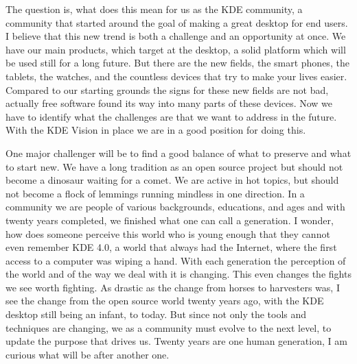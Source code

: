 The question is, what does this mean for us as the KDE community, a community that started around the goal of making a great desktop for end users. I believe that this new trend is both a challenge and an opportunity at once. We have our main products, which target at the desktop, a solid platform which will be used still for a long future. But there are the new fields, the smart phones, the tablets, the watches, and the countless devices that try to make your lives easier. Compared to our starting grounds the signs for these new fields are not bad, actually free software found its way into many parts of these devices. Now we have to identify what the challenges are that we want to address in the future. With the KDE Vision in place we are in a good position for doing this.

One major challenger will be to find a good balance of what to preserve and what to start new. We have a long tradition as an open source project but should not become a dinosaur waiting for a comet. We are active in hot topics, but should not become a flock of lemmings running mindless in one direction. In a community we are people of various backgrounds, educations, and ages and with twenty years completed, we finished what one can call a generation. I wonder, how does someone perceive this world who is young enough that they cannot even remember KDE 4.0, a world that always had the Internet, where the first access to a computer was wiping a hand. With each generation the perception of the world and of the way we deal with it is changing. This even changes the fights we see worth fighting. As drastic as the change from horses to harvesters was, I see the change from the open source world twenty years ago, with the KDE desktop still being an infant, to today. But since not only the tools and techniques are changing, we as a community must evolve to the next level, to update the purpose that drives us. Twenty years are one human generation, I am curious what will be after another one.

